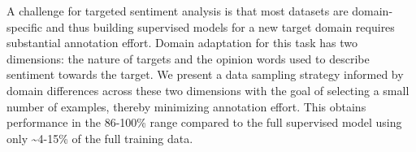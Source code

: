A challenge for targeted sentiment analysis is that most datasets are domain-specific and thus building supervised models for a new target domain requires substantial annotation effort. Domain adaptation for this task has two dimensions: the nature of targets and the opinion words used to describe sentiment towards the target. We present a data sampling strategy informed by domain differences across these two dimensions with the goal of selecting a small number of examples, thereby minimizing annotation effort. This obtains performance in the 86-100\% range compared to the full supervised model using only {\textasciitilde}4-15\% of the full training data.
